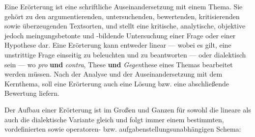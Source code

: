 



\thispagestyle{plain}



Eine Er\"{o}rterung ist eine schriftliche Auseinandersetzung mit einem Thema. Sie geh\"{o}rt zu den argumentierenden, untersuchenden, bewertenden, kritisierenden sowie \"{u}berzeugenden Textsorten, und stellt eine kritische, analytische, objektive jedoch meingungsbetonte und -bildende Untersuchung einer Frage oder einer Hypothese dar. Eine Er\"{o}rterung kann entweder linear --- wobei es gilt, eine unstrittige Frage einseitig zu beleuchten und zu beantworten --- oder dialektisch sein --- wo \emph{pro} \textbf{und} \emph{contra}, These \textbf{und} \emph{Gegen}these eines Themas bearbeitet werden m\"{u}ssen. Nach der Analyse und der Auseinandersetzung mit dem Kernthema, soll eine Er\"{o}rterung auch eine L\"{o}sung bzw. eine abschlie\ss{}ende Bewertung liefern.


Der Aufbau einer Er\"{o}rterung ist im Gro\ss{}en und Ganzen f\"{u}r sowohl die lineare als auch die dialektische Variante gleich und folgt immer einem bestimmten, vordefinierten sowie operatoren- bzw. aufgabenstellungsunabh\"{a}ngigen Schema:

